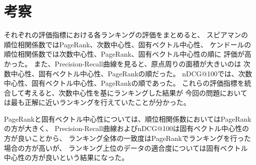 \documentclass{jsarticle}
\begin{document}
\section{考察}
それぞれの評価指標における各ランキングの評価をまとめると、
スピアマンの順位相関係数ではPageRank、次数中心性、固有ベクトル中心性、
ケンドールの順位相関係数では次数中心性、PageRank、固有ベクトル中心性の順に
評価が高かった。
また、Precision-Recall曲線を見ると、原点周りの面積が大きいのは
次数中心性、固有ベクトル中心性、PageRankの順だった。
nDCG@100では、次数中心性、固有ベクトル中心性、PageRankの順であった。
これらの評価指標を統合して考えると、次数中心性を基にランキングした結果が
今回の問題においては最も正解に近いランキングを行えていたことが分かった。

PageRankと固有ベクトル中心性については、順位相関係数においてはPageRankの方が大きく、
Precision-Recall曲線およびnDCG@100は固有ベクトル中心性の方が良いことから、
ランキング全体の一致度はPageRankでランキングを行った場合の方が高いが、
ランキング上位のデータの適合度については固有ベクトル中心性の方が良いという結果になった。
\end{document}
